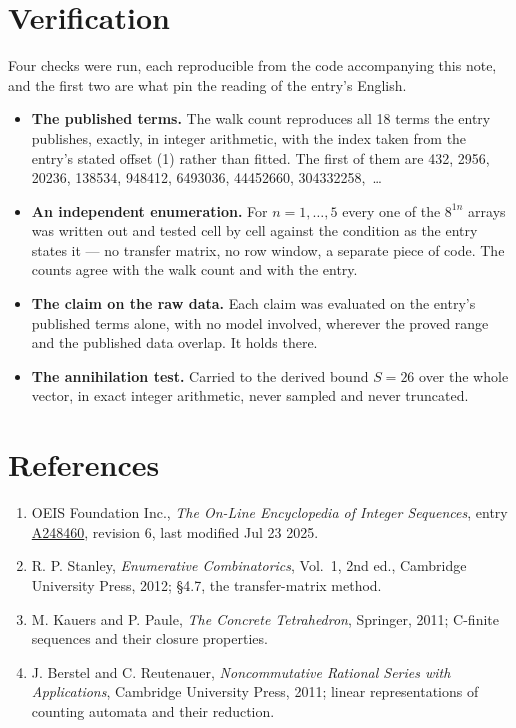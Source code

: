\documentclass[11pt]{article}
\theoremstyle{definition}
\begin{document}
\section{Verification}

Four checks were run, each reproducible from the code accompanying this note, and the first two are what pin the reading of the entry's English.

\begin{itemize}

\item {\bfseries The published terms.} The walk count reproduces all 18 terms the entry publishes, exactly, in integer arithmetic, with the index taken from the entry's stated offset (1) rather than fitted. The first of them are 432, 2956, 20236, 138534, 948412, 6493036, 44452660, 304332258,~\dots

\item {\bfseries An independent enumeration.} For $n = 1,\dots,5$ every one of the $8^{1n}$ arrays was written out and tested cell by cell against the condition as the entry states it --- no transfer matrix, no row window, a separate piece of code. The counts agree with the walk count and with the entry.

\item {\bfseries The claim on the raw data.} Each claim was evaluated on the entry's published terms alone, with no model involved, wherever the proved range and the published data overlap. It holds there.

\item {\bfseries The annihilation test.} Carried to the derived bound $S = 26$ over the whole vector, in exact integer arithmetic, never sampled and never truncated.

\end{itemize}

\section{References}

\begin{enumerate}

\item OEIS Foundation Inc., \emph{The On-Line Encyclopedia of Integer Sequences}, entry \href{https://oeis.org/A248460}{A248460}, revision 6, last modified Jul 23 2025.

\item R. P. Stanley, \emph{Enumerative Combinatorics}, Vol.~1, 2nd ed., Cambridge University Press, 2012; \S4.7, the transfer-matrix method.

\item M. Kauers and P. Paule, \emph{The Concrete Tetrahedron}, Springer, 2011; C-finite sequences and their closure properties.

\item J. Berstel and C. Reutenauer, \emph{Noncommutative Rational Series with Applications}, Cambridge University Press, 2011; linear representations of counting automata and their reduction.

\end{enumerate}
\end{document}
